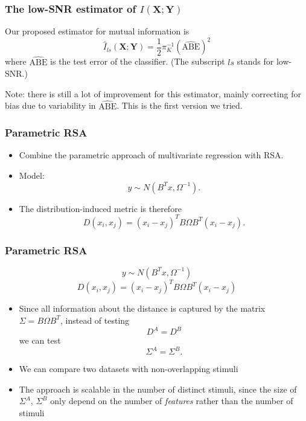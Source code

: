 \documentclass{beamer}
\newcommand{\bX}{\boldsymbol{X}}
\newcommand{\bY}{\boldsymbol{Y}}
\begin{document}
\begin{frame}
\frametitle{The low-SNR estimator of $I(\bX;\bY)$}

Our proposed estimator for mutual information is
\[
\hat{I}_{ls}(\bX; \bY) = \frac{1}{2}\pi_K^{-1}(\widehat{\text{ABE}})^2
\]
where $\widehat{\text{ABE}}$ is the test error of the classifier.
(The subscript $ls$ stands for low-SNR.)

\vspace{0.3in}

Note: there is still a lot of improvement for this estimator,
mainly correcting for bias due to variability in $\widehat{\text{ABE}}$.
This is the first version we tried.

\end{frame}

{








}

\begin{frame}
\frametitle{Parametric RSA}
\begin{itemize}
\item Combine the parametric approach of multivariate regression with RSA.
\item Model:
\[
y \sim N(B^T x, \Omega^{-1}).
\]
\item The distribution-induced metric is therefore
\[
D(x_i, x_j) = (x_i - x_j)^T B \Omega B^T (x_i - x_j).
\]
\end{itemize}
\end{frame}

\begin{frame}
\frametitle{Parametric RSA}
\[
y \sim N(B^T x, \Omega^{-1})
\]
\[
D(x_i, x_j) = (x_i - x_j)^T B \Omega B^T (x_i - x_j)
\]
\begin{itemize}
\item Since all information about the distance is captured by the matrix $\Sigma = B\Omega B^T$, instead of testing
\[
D^A = D^B
\]
we can test
\[
\Sigma^A = \Sigma^B.
\]
\item We can compare two datasets with non-overlapping stimuli
\item The approach is scalable in the number of distinct stimuli,
  since the size of $\Sigma^A$, $\Sigma^B$ only depend on the number of
  \emph{features} rather than the number of stimuli
\end{itemize}
\end{frame}
\end{document}
